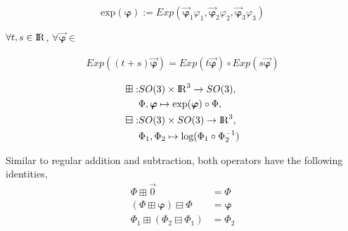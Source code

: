 \begin{equation}
  \text{exp}(\boldsymbol{\varphi}) := Exp(
    \vec{\boldsymbol{\varphi}}_{1}\varphi_{1},
    \vec{\boldsymbol{\varphi}}_{2}\varphi_{2},
    \vec{\boldsymbol{\varphi}}_{3}\varphi_{3}
  )
\end{equation}


$\forall t, s \in {\rm I\!R}$, $\forall \vec{\boldsymbol{\varphi}} \in $

\begin{align}
  Exp((t + s) \vec{\boldsymbol{\varphi}}) =
    Exp(t\vec{\boldsymbol{\varphi}}) \circ Exp(s\vec{\boldsymbol{\varphi}})
\end{align}


\begin{align}
  \boxplus :& SO(3) \times {\rm I\!R}^{3} \rightarrow SO(3), \\
    &\Phi, \boldsymbol{\varphi}
      \mapsto \text{exp}(\boldsymbol{\varphi}) \circ \Phi, \nonumber \\
  \boxminus :& SO(3) \times SO(3) \rightarrow {\rm I\!R}^{3}, \\
    &\Phi_1, \Phi_2 \mapsto \text{log}(\Phi_1 \circ \Phi_{2}^{-1}) \nonumber
\end{align}

Similar to regular addition and subtraction, both operators have the following
identities,
%
\begin{align}
  \Phi \boxplus \Vec{0} &= \Phi \\
  (\Phi \boxplus \boldsymbol{\varphi}) \boxminus \Phi &= \boldsymbol{\varphi} \\
  \Phi_1 \boxplus (\Phi_2 \boxminus \Phi_1) &= \Phi_2
\end{align}
